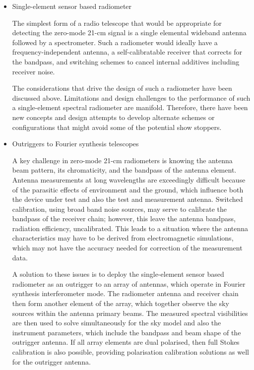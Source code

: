 \begin{itemize}
\item
  Single-element sensor based radiometer
  
  The simplest form of a radio telescope that would be appropriate for detecting the zero-mode 21-cm signal is a single elemental wideband antenna followed by a spectrometer.  Such a radiometer would ideally have a frequency-independent antenna, a self-calibratable receiver that corrects for the bandpass, and switching schemes to cancel internal additives including receiver noise.
  
  The considerations that drive the design of such a radiometer have been discussed above.  Limitations and design challenges to the performance of such a single-element spectral radiometer are manifold.  Therefore, there have been new concepts and design attempts to develop alternate schemes or configurations that might avoid some of the potential show stoppers.
  
\item
  Outriggers to Fourier synthesis telescopes
  
  A key challenge in zero-mode 21-cm radiometers is knowing the antenna beam pattern, its chromaticity, and the bandpass of the antenna element.  Antenna measurements at long wavelengths are exceedingly difficult because of the parasitic effects of environment and the ground, which influence both the device under test and also the test and measurement antenna.  Switched calibration, using broad band noise sources, may serve to calibrate the bandpass of the receiver chain; however, this leave the antenna bandpass, radiation efficiency, uncalibrated.  This leads to a situation where the antenna characteristics may have to be derived from electromagnetic simulations, which may not have the accuracy needed for correction of the measurement data.
  
  A solution to these issues is to deploy the single-element sensor based radiometer as an outrigger to an array of antennas, which operate in Fourier synthesis interferometer mode.  The radiometer antenna and receiver chain then form another element of the array, which together observe the sky sources within the antenna primary beams.  The measured spectral visibilities are then used to solve simultaneously for the sky model and also the instrument parameters, which include the bandpass and beam shape of the outrigger antenna. If all array elements are dual polarised, then full Stokes calibration is also possible, providing polarisation calibration solutions as well for the outrigger antenna.
  

\end{itemize}
